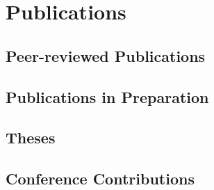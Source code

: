 \ifacademic
    \section{Publications}
        \subsection{Peer-reviewed Publications}
        \begin{refsection}
        	\vspace{2mm}
            \nocite{
            	DiBaldassarre2018,
                Breinl2017,
                GironsLopez2017,
                GironsLopez2017a,
                GironsLopez2016a,
                Mbanguka2016,
                GironsLopez2015
            }
            \printbibliography[heading=none]
        \end{refsection}
        \subsection{Publications in Preparation}
        \begin{refsection}
        	\vspace{2mm}
            \nocite{
                Rivera2017,
                Rivera2017a
            }
            \printbibliography[heading=none]
        \end{refsection}
        \subsection{Theses}
        \begin{refsection}
        	\vspace{2mm}
            \nocite{
                GironsLopez2016,
                GironsLopez2011
            }
            \printbibliography[heading=none]
        \end{refsection}
        \subsection{Conference Contributions}
        \begin{refsection}
        	\vspace{2mm}
            \nocite{
            	Fourniadis2018,
            	GironsLopez2018,
            	GironsLopez2018a,
                Breinl2017a,
                GironsLopez2017b,
                GironsLopez2017c,
                GironsLopez2017d,
                GironsLopez2016b,
                GironsLopez2016c,
                Rivera2016,
                Rivera2015,
                GironsLopez2013,
                Mbanguka2013
            }
            \printbibliography[heading=none]
        \end{refsection}
\else
    \ifswedish
